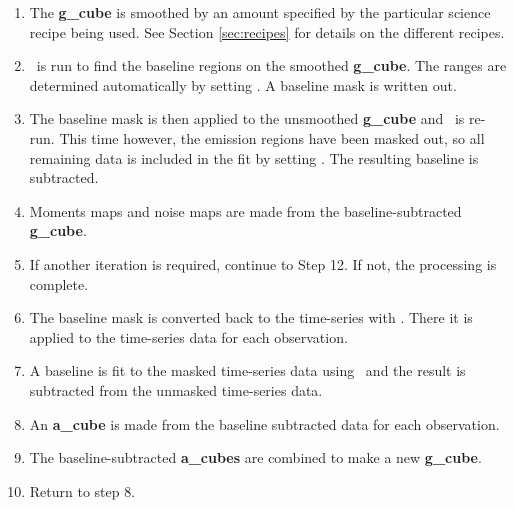 \documentclass[11pt,oneside,chapters]{starlink}
\begin{document}
\begin{enumerate}[label=(\textbf{\arabic*})]
\item The \textbf{g\_cube} is smoothed by an amount specified by the
particular science recipe being used. See Section \ref{sec:recipes}
for details on the different recipes.

\item \mfittrend\ is run to find the baseline regions on the smoothed
\textbf{g\_cube}. The ranges are determined automatically by setting
. A baseline mask is written out.

\item The baseline mask is then applied to the unsmoothed
\textbf{g\_cube} and \mfittrend\ is re-run. This time however, the
emission regions have been masked out, so all remaining data is
included in the fit by setting . The resulting
baseline is subtracted.

\item Moments maps and noise maps are made from the
baseline-subtracted \textbf{g\_cube}.

\item If another iteration is required, continue to Step 12. If not,
the processing is complete.

\item The baseline mask is converted back to the time-series with
\unmakecube. There it is applied to the time-series data for each
observation.

\item A baseline is fit to the masked time-series data using
\mfittrend\ and the result is subtracted from the unmasked time-series
data.

\item An \textbf{a\_cube} is made from the baseline subtracted data
for each observation.

\item The baseline-subtracted \textbf{a\_cubes} are combined to make a
new \textbf{g\_cube}.

\item Return to step 8.
\end{enumerate}
\end{document}
